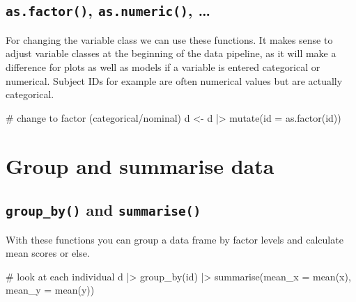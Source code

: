 \documentclass[
  letterpaper,
  DIV=11,
  numbers=noendperiod]{scrreprt}
\newenvironment{Shaded}{\begin{snugshade}}{\end{snugshade}}
\newcommand{\AttributeTok}[1]{\textcolor[rgb]{0.40,0.45,0.13}{#1}}
\newcommand{\CommentTok}[1]{\textcolor[rgb]{0.37,0.37,0.37}{#1}}
\newcommand{\FunctionTok}[1]{\textcolor[rgb]{0.28,0.35,0.67}{#1}}
\newcommand{\NormalTok}[1]{\textcolor[rgb]{0.00,0.23,0.31}{#1}}
\newcommand{\OtherTok}[1]{\textcolor[rgb]{0.00,0.23,0.31}{#1}}
\newcommand{\SpecialCharTok}[1]{\textcolor[rgb]{0.37,0.37,0.37}{#1}}
\begin{document}
\hypertarget{as.factor-as.numeric}{%
\subsection{\texorpdfstring{\texttt{as.factor()}, \texttt{as.numeric()},
\ldots{}}{as.factor(), as.numeric(), \ldots{}}}\label{as.factor-as.numeric}}

For changing the variable class we can use these functions. It makes
sense to adjust variable classes at the beginning of the data pipeline,
as it will make a difference for plots as well as models if a variable
is entered categorical or numerical. Subject IDs for example are often
numerical values but are actually categorical.

\begin{Shaded}
\begin{Highlighting}[]
\CommentTok{\# change to factor (categorical/nominal)}
\NormalTok{d }\OtherTok{\textless{}{-}}\NormalTok{ d }\SpecialCharTok{|\textgreater{}} 
    \FunctionTok{mutate}\NormalTok{(}\AttributeTok{id =} \FunctionTok{as.factor}\NormalTok{(id))}
\end{Highlighting}
\end{Shaded}

\hypertarget{group-and-summarise-data}{%
\section{Group and summarise data}\label{group-and-summarise-data}}

\hypertarget{group_by-and-summarise}{%
\subsection{\texorpdfstring{\texttt{group\_by()} and
\texttt{summarise()}}{group\_by() and summarise()}}\label{group_by-and-summarise}}

With these functions you can group a data frame by factor levels and
calculate mean scores or else.

\begin{Shaded}
\begin{Highlighting}[]
\CommentTok{\# look at each individual}
\NormalTok{d }\SpecialCharTok{|\textgreater{}} \FunctionTok{group\_by}\NormalTok{(id) }\SpecialCharTok{|\textgreater{}}
    \FunctionTok{summarise}\NormalTok{(}\AttributeTok{mean\_x =} \FunctionTok{mean}\NormalTok{(x),}
              \AttributeTok{mean\_y =} \FunctionTok{mean}\NormalTok{(y))}
\end{Highlighting}
\end{Shaded}
\end{document}
